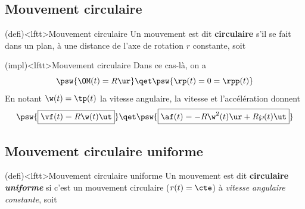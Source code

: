 \documentclass[../../main/main.tex]{subfiles}
\begin{document}
\subsection{Mouvement circulaire}

\begin{tcb*}(defi)<lftt>{Mouvement circulaire}
	Un mouvement est dit \textbf{circulaire} s'il se fait dans un plan, à une
	distance de l'axe de rotation $r$ constante, soit
	\psw{%
		\[
			r(t) = \cte = R
		\]
	}%
	\vspace{-25pt}
\end{tcb*}

\begin{tcb}(impl)<lftt>{Mouvement circulaire}
  Dans ce cas-là, on a
\[
  \psw{\OM(t) = R\ur}
  \qet
  \psw{\rp(t) = 0 = \rpp(t)}
\]
En notant $\w(t) = \tp(t)$ la vitesse angulaire, la vitesse et l'accélération
donnent
\[
  \psw{\boxed{\vf(t) = R\w(t)\ut}}
  \qet
  \psw{\boxed{\af(t) = -R\w^2(t)\ur + R\wp(t)\ut}}
\]
\vspace{-35pt}
\end{tcb}


\vspace{-15pt}

\subsection{Mouvement circulaire uniforme}
\begin{tcb*}(defi)<lftt>{Mouvement circulaire uniforme}
	Un mouvement est dit \textbf{circulaire \textit{uniforme}} si c'est un
	mouvement circulaire ($r(t) = \cte$) à \textit{vitesse angulaire
		constante}, soit
	\psw{%
		\[
				r(t) = R
        \qet
				\tp(t) = \w_0
		\]
	}%
  \vspace{-25pt}
\end{tcb*}
\end{document}
